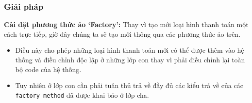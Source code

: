 \subsubsection{Giải pháp}
\begin{flushleft}
    \textbf{Cài đặt phương thức ảo `Factory':} Thay vì tạo mới loại hình thanh toán một cách trực tiếp, giờ đây chúng ta sẽ tạo mới thông qua các phương thức ảo trên.
    \begin{itemize}
        \item Điều này cho phép những loại hình thanh toán mới có thể được thêm vào hệ thống và điều chỉnh độc lập ở những lớp con thay vì phải điều chỉnh lại toàn bộ code của hệ thống.
        \item Tuy nhiên ở lớp con cần phải tuân thủ trả về đầy đủ các kiểu trả về của các \verb|factory method| đã được khai báo ở lớp cha.
    \end{itemize}
\end{flushleft}

